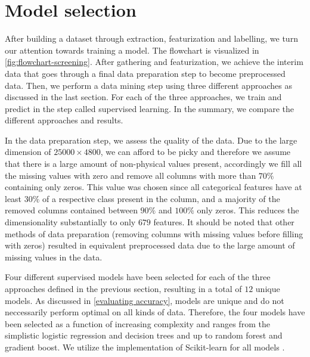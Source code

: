 \begin{comment}
\begin{figure}[t]{1\textwidth}
    \centering
    \texttt{[image: ../predicting-solid-state-qubit-candidates/reports/figures/buildingFeatures/histogram\_oxid\_nelements.pdf]}
    \caption{}
\end{figure}%
\end{comment}

\section{Model selection}

After building a dataset through extraction, featurization and labelling, we turn our attention towards training a model. The flowchart is visualized in \autoref{fig:flowchart-screening}. After gathering and featurization, we achieve the interim data that goes through a final data preparation step to become preprocessed data. Then, we perform a data mining step using three different approaches as discussed in the last section. For each of the three approaches, we train and predict in the step called supervised learning. In the summary, we compare the different approaches and results.

In the data preparation step, we assess the quality of the data. Due to the large dimension of $25000 \times 4800$, we can afford to be picky and therefore we assume that there is a large amount of non-physical values present, accordingly we fill all the missing values with zero and remove all columns with more than $70\%$ containing only zeros. This value was chosen since all categorical features have at least $30\%$ of a respective class present in the column, and a majority of the removed columns contained between $90\%$ and $100\%$ only zeros. This reduces the dimensionality substantially to only $679$ features. It should be noted that other methods of data preparation (removing columns with missing values before filling with zeros) resulted in equivalent preprocessed data due to the large amount of missing values in the data.

Four different supervised models have been selected for each of the three approaches defined in the previous section, resulting in a total of $12$ unique models. As discussed in \autoref{evaluating accuracy}, models are unique and do not neccessarily perform optimal on all kinds of data. Therefore, the four models have been selected as a function of increasing complexity and ranges from the simplistic logistic regression and decision trees and up to random forest and gradient boost. We utilize the implementation of Scikit-learn for all models \cite{Pedregosa2012}.

